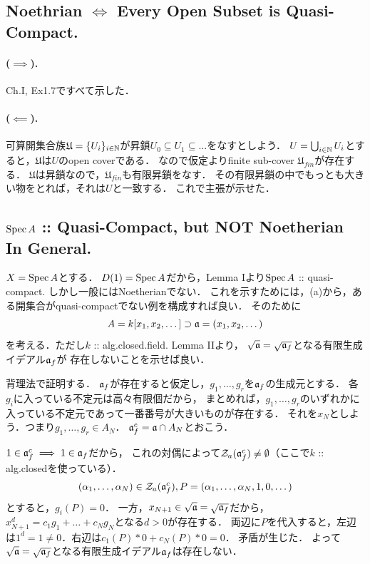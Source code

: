 \documentclass[a4paper]{jsarticle}
\begin{document}
    \subsection{Noethrian $\iff$ Every Open Subset is Quasi-Compact.}
    \paragraph{($\implies$).}
    Ch.I, Ex1.7ですべて示した．

    \paragraph{($\impliedby$).}
    可算開集合族$\mathfrak{U}=\{U_i\}_{i \in \mathbb{N}}$が昇鎖$U_0 \subseteq U_1 \subseteq \dots$をなすとしよう．
    $U=\bigcup_{i \in \mathbb{N}} U_i$とすると，$\mathfrak{U}$は$U$のopen coverである．
    なので仮定よりfinite sub-cover $\mathfrak{U}_{fin}$が存在する．
    $\mathfrak{U}$は昇鎖なので，$\mathfrak{U}_{fin}$も有限昇鎖をなす．
    その有限昇鎖の中でもっとも大きい物をとれば，それは$U$と一致する．
    これで主張が示せた．

    \subsection{$\operatorname{Spec} A$ :: Quasi-Compact, but NOT Noetherian In General.}
    $X=\operatorname{Spec} A$とする．
    $D(1)=\operatorname{Spec} A$だから，Lemma Iより$\operatorname{Spec} A$ :: quasi-compact.
    しかし一般にはNoetherianでない．
    これを示すためには，(a)から，ある開集合がquasi-compactでない例を構成すれば良い．
    そのために
    \[ A=k[x_1,x_2,\dots] \supset \mathfrak{a}=(x_1,x_2,\dots) \]
    を考える．ただし$k$ :: alg.closed.field.
    Lemma IIより，
    $\sqrt{\mathfrak{a}}=\sqrt{\mathfrak{a}_f}$となる有限生成イデアル$\mathfrak{a}_f$が
    存在しないことを示せば良い．

    背理法で証明する．
    $\mathfrak{a}_f$が存在すると仮定し，$g_1,\dots,g_r$を$\mathfrak{a}_f$の生成元とする．
    各$g_i$に入っている不定元は高々有限個だから，
    まとめれば，$g_1,\dots,g_r$のいずれかに入っている不定元であって一番番号が大きいものが存在する．
    それを$x_N$としよう．つまり$g_1,\dots,g_r \in A_N$．
    $\mathfrak{a}_f^c=\mathfrak{a} \cap A_N$とおこう．

    $1 \in \mathfrak{a}_f^c \implies 1 \in \mathfrak{a}_f$だから，
    これの対偶によって$\mathcal{Z}_a(\mathfrak{a}_f^c) \neq \emptyset$（ここで$k$ :: alg.closedを使っている）．
    \[ (\alpha_1,\dots,\alpha_N) \in \mathcal{Z}_a(\mathfrak{a}_f^c), P=(\alpha_1,\dots,\alpha_N,1,0,\dots) \]
    とすると，$g_i(P)=0$．
    一方，$x_{N+1} \in \sqrt{\mathfrak{a}}=\sqrt{\mathfrak{a}_f}$だから，
    $x_{N+1}^d=c_1g_1+\dots+c_Ng_N$となる$d>0$が存在する．
    両辺に$P$を代入すると，左辺は$1^d=1 \neq 0$．右辺は$c_1(P)*0+c_N(P)*0=0$．
    矛盾が生じた．
    よって$\sqrt{\mathfrak{a}}=\sqrt{\mathfrak{a}_f}$となる有限生成イデアル$\mathfrak{a}_f$は存在しない．
\end{document}
